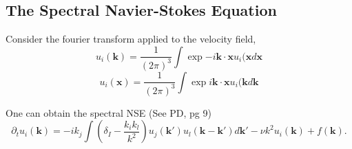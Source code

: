 \documentclass[11pt]{article}
\begin{document}
\subsection{The Spectral Navier-Stokes Equation}
\begin{flushleft}


Consider the fourier transform applied to the velocity field,
\[
u_{i}(\mathbf{k})=\frac{1}{(2\pi)^{3}}\int \exp{-i\mathbf{k}\cdot\mathbf{x}}u_{i}(\mathbf{x}d\mathbf{x}
\]
\[
u_{i}(\mathbf{x})=\frac{1}{(2\pi)^{3}}\int \exp{i\mathbf{k}\cdot\mathbf{x}}u_{i}(\mathbf{k}d\mathbf{k}
\]


One can obtain the spectral NSE (See PD, pg 9)
\[
\partial_{t}u_{i}(\mathbf{k})=
-ik_{j}\int \left(\delta_{I}-\frac{k_{i}k_{l}}{k^{2}}\right) u_{j}(\mathbf{k}') u_{l}(\mathbf{k}-\mathbf{k}')d\mathbf{k}' -\nu k^{2}u_{i}(\mathbf{k})+f(\mathbf{k}).
\]

\end{flushleft}
\end{document}
